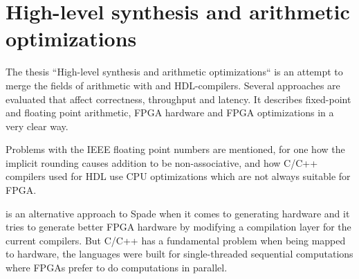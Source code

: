 \documentclass[msc,lith,english]{liuthesis}
\begin{document}
\cite{src:MinOfFrac}

\section{High-level synthesis and arithmetic optimizations}
The thesis ``High-level synthesis and arithmetic optimizations`` is an attempt to merge the fields of arithmetic with and HDL-compilers. Several approaches are evaluated that affect correctness, throughput and latency. It describes fixed-point and floating point arithmetic, FPGA hardware and FPGA optimizations in a very clear way.

Problems with the IEEE floating point numbers are mentioned, for one how the implicit rounding causes addition to be non-associative, and how C/C++ compilers used for HDL use CPU optimizations which are not always suitable for FPGA.

\citeauthor{src:HLSandOpt} is an alternative approach to Spade when it comes to generating hardware and it tries to generate better FPGA hardware by modifying a compilation layer for the current compilers. But C/C++ has a fundamental problem when being mapped to hardware, the languages were built for single-threaded sequential computations where FPGAs prefer to do computations in parallel.

\cite{src:HLSandOpt}

\end{document}
